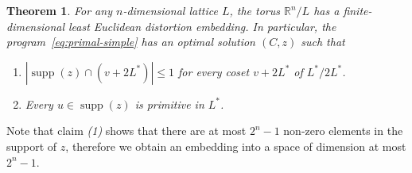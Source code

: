 \documentclass{amsart}
\newtheorem{theorem}[defin]{Theorem}
\newcommand{\R}{\mathbb{R}}
\DeclareMathOperator{\supp}{supp}
\begin{document}
\begin{theorem}\label{thm:finite-support}
	For any $ n $-dimensional lattice $ L $, the torus $ \R^n /L $ has a finite-dimensional least Euclidean distortion embedding.
	In particular, the program~\eqref{eq:primal-simple} has an optimal solution $ (C,z) $ such that
	\begin{enumerate}
		\item \label{item:finite-supp}  $| \supp(z)  \cap (v+2L^*) | \le 1$ for every coset $ v+2L^* $ of $  L^*/2L^* $.
		\item \label{item:primitive} Every $ u \in \supp(z) $ is primitive in $ L^* $.
	\end{enumerate}
\end{theorem}

Note that claim \textit{(1)} shows that there are at most $2^n -1$ non-zero elements in the support of $z$, therefore we obtain an embedding into a space of dimension at most $2^n-1$.
\end{document}
